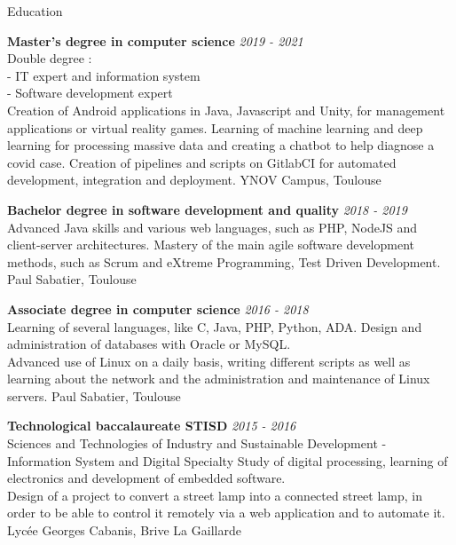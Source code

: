 \documentclass[
	10pt, %
]{resume}
\begin{document}

\begin{rSection}{Education}
	
	\textbf{Master’s degree in computer science} \hfill \textit{2019 - 2021} \\ 
	Double degree : \\
	- IT expert and information system \\
	- Software development expert \\
	Creation of Android applications in Java, Javascript and Unity, for management applications or virtual reality games. 
	Learning of machine learning and deep learning for processing massive data and creating a chatbot to help diagnose a covid case. 
	Creation of pipelines and scripts on GitlabCI for automated development, integration and deployment.
	\hfill { YNOV Campus, Toulouse }

	\textbf{Bachelor degree in software development and quality} \hfill {\em 2018 - 2019} \\ 
	Advanced Java skills and various web languages, such as PHP, NodeJS and client-server architectures. 
	Mastery of the main agile software development methods, such as Scrum and eXtreme Programming, Test Driven Development.
	\hfill { Paul Sabatier, Toulouse }

	\textbf{Associate degree in computer science} \hfill {\em 2016 - 2018} \\
	Learning of several languages, like C, Java, PHP, Python, ADA. Design and administration of databases with Oracle or MySQL. \\
	Advanced use of Linux on a daily basis, writing different scripts as well as learning about the network and the administration and maintenance of Linux servers.
	\hfill { Paul Sabatier, Toulouse }

	\textbf{Technological baccalaureate STISD} \hfill {\em 2015 - 2016} \\ 
	Sciences and Technologies of Industry and Sustainable Development - 
	Information System and Digital Specialty Study of digital processing, learning of electronics and development of embedded software. \\ 
	Design of a project to convert a street lamp into a connected street lamp, in order to be able to control it remotely via a web application and to automate it. 
	\hfill { Lycée Georges Cabanis, Brive La Gaillarde }

\end{rSection}
\end{document}
